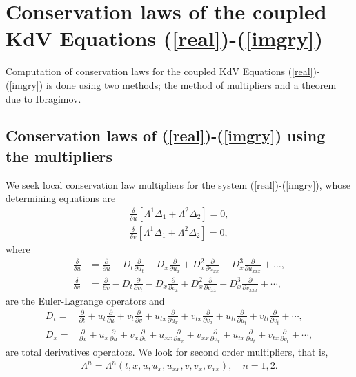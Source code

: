 \section{Conservation laws of the coupled KdV Equations (\ref{real})-(\ref{imgry})}
Computation of conservation laws for the coupled KdV Equations (\ref{real})-(\ref{imgry}) is done using two methods; the method of  multipliers  and a theorem due to Ibragimov.
\subsection{Conservation laws of (\ref{real})-(\ref{imgry}) using the multipliers}
We seek local conservation law multipliers for the system (\ref{real})-(\ref{imgry}), whose determining equations are 
\begin{align}
\label{vau}\frac{\delta}{ \delta u} \left[ \Lambda^1\Delta_1 + \Lambda^2 \Delta_2 \right] =0,\\
\label{vav}\frac{\delta}{ \delta v} \left[ \Lambda^1\Delta_1 + \Lambda^2 \Delta_2 \right] =0,
\end{align} where 
\begin{align} \frac{ \delta }{ \delta u} &= \frac{ \partial }{ \partial u}-D_t \frac{\partial }{ \partial u_t}-D_x \frac{\partial }{ \partial u_x}+ D^2_x \frac{ \partial }{ \partial u_{xx}}-D_x^3 \frac{ \partial }{ \partial u_{xxx}}+ \ldots,\\
\frac{ \delta }{ \delta v} &= \frac{ \partial }{ \partial v}-D_t \frac{\partial }{ \partial v_t}-D_x \frac{\partial }{ \partial v_x}+ D^2_x \frac{ \partial }{ \partial v_{xx}}- D_x^3\frac{ \partial }{ \partial v_{xxx}}+ \cdots,
\end{align} are the Euler-Lagrange operators and \begin{align}
\label{dt} D_t =& \frac{\partial}{\partial t} + u_t\frac{\partial}{\partial u}+ v_t\frac{\partial}{\partial v}
+ u_{tx} \frac{\partial}{\partial u_x} +  v_{tx} \frac{\partial}{\partial v_x}+ u_{tt}\frac{\partial}{\partial u_t} + v_{tt}\frac{\partial}{\partial v_t} + \cdots  , \\
\label{dx} D_x =& \frac{\partial}{\partial x} + u_x \frac{\partial}{\partial u}+ v_x \frac{\partial}{\partial v}+ u_{xx}\frac{\partial}
{\partial u_x} + v_{xx}\frac{\partial}
{\partial v_x}+ u_{tx} \frac{\partial}{\partial u_{t}} + v_{tx} \frac{\partial}{\partial v_{t}}+\cdots,
\end{align} are total derivatives operators.
We look for second order multipliers,  that is, 
\begin{align}
	\Lambda^n = \Lambda^n(t,x,u,u_x,u_{xx},v,v_x,v_{xx}), \quad n = 1,2.
\end{align}
